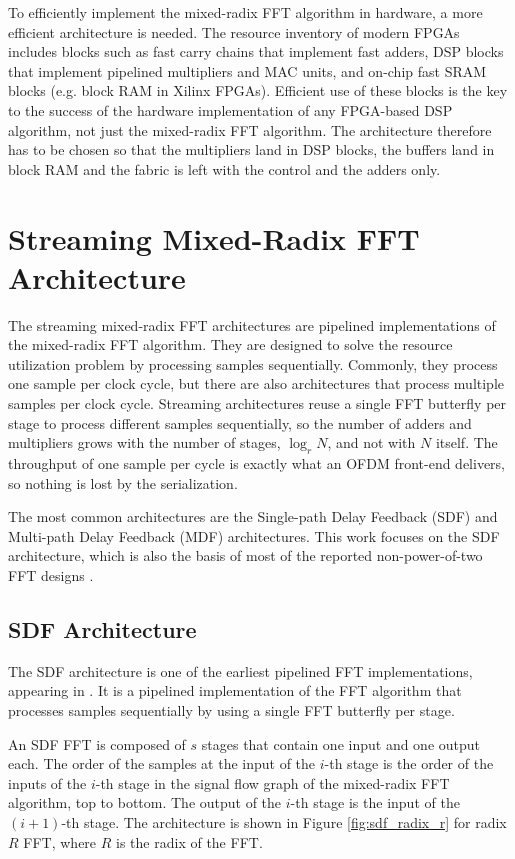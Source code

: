 \documentclass[a4paper,12pt, master]{etf}
\begin{document}
To efficiently implement the mixed-radix FFT algorithm in hardware, a more efficient architecture is needed. The resource inventory of modern FPGAs includes blocks such as fast carry chains that implement fast adders, DSP blocks that implement pipelined multipliers and MAC units, and on-chip fast SRAM blocks (e.g. block RAM in Xilinx FPGAs). Efficient use of these blocks is the key to the success of the hardware implementation of any FPGA-based DSP algorithm, not just the mixed-radix FFT algorithm. The architecture therefore has to be chosen so that the multipliers land in DSP blocks, the buffers land in block RAM and the fabric is left with the control and the adders only.

\section{Streaming Mixed-Radix FFT Architecture}

The streaming mixed-radix FFT architectures are pipelined implementations of the mixed-radix FFT algorithm. They are designed to solve the resource utilization problem by processing samples sequentially. Commonly, they process one sample per clock cycle, but there are also architectures that process multiple samples per clock cycle. Streaming architectures reuse a single FFT butterfly per stage to process different samples sequentially, so the number of adders and multipliers grows with the number of stages, $\log_r N$, and not with $N$ itself. The throughput of one sample per cycle is exactly what an OFDM front-end delivers, so nothing is lost by the serialization.

The most common architectures are the Single-path Delay Feedback (SDF) and Multi-path Delay Feedback (MDF) architectures. This work focuses on the SDF architecture, which is also the basis of most of the reported non-power-of-two FFT designs \cite{bautista2023}.

\subsection{SDF Architecture}

The SDF architecture is one of the earliest pipelined FFT implementations, appearing in \cite{groginsky1970}. It is a pipelined implementation of the FFT algorithm that processes samples sequentially by using a single FFT butterfly per stage.

An SDF FFT is composed of $s$ stages that contain one input and one output each. The order of the samples at the input of the $i$-th stage is the order of the inputs of the $i$-th stage in the signal flow graph of the mixed-radix FFT algorithm, top to bottom. The output of the $i$-th stage is the input of the $(i+1)$-th stage. The architecture is shown in Figure \ref{fig:sdf_radix_r} for radix $R$ FFT, where $R$ is the radix of the FFT.
\end{document}

